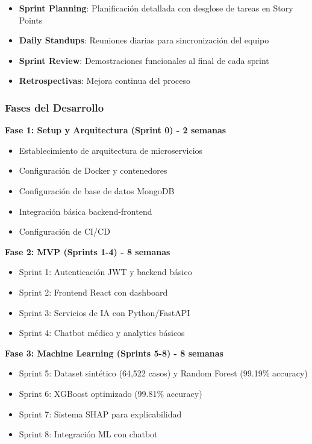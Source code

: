 \documentclass[12pt,a4paper]{article}
\begin{document}
\begin{itemize}
    \item \textbf{Sprint Planning}: Planificación detallada con desglose de tareas en Story Points
    \item \textbf{Daily Standups}: Reuniones diarias para sincronización del equipo
    \item \textbf{Sprint Review}: Demostraciones funcionales al final de cada sprint
    \item \textbf{Retrospectivas}: Mejora continua del proceso
\end{itemize}

\subsubsection{Fases del Desarrollo}

\textbf{Fase 1: Setup y Arquitectura (Sprint 0) - 2 semanas}
\begin{itemize}
    \item Establecimiento de arquitectura de microservicios
    \item Configuración de Docker y contenedores
    \item Configuración de base de datos MongoDB
    \item Integración básica backend-frontend
    \item Configuración de CI/CD
\end{itemize}

\textbf{Fase 2: MVP (Sprints 1-4) - 8 semanas}
\begin{itemize}
    \item Sprint 1: Autenticación JWT y backend básico
    \item Sprint 2: Frontend React con dashboard
    \item Sprint 3: Servicios de IA con Python/FastAPI
    \item Sprint 4: Chatbot médico y analytics básicos
\end{itemize}

\textbf{Fase 3: Machine Learning (Sprints 5-8) - 8 semanas}
\begin{itemize}
    \item Sprint 5: Dataset sintético (64,522 casos) y Random Forest (99.19\% accuracy)
    \item Sprint 6: XGBoost optimizado (99.81\% accuracy)
    \item Sprint 7: Sistema SHAP para explicabilidad
    \item Sprint 8: Integración ML con chatbot
\end{itemize}
\end{document}
